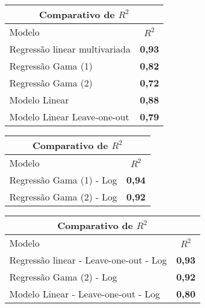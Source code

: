 \documentclass{article}
\begin{document}

\begin{table}[]
	\centering
	\begin{tabular}{lc}
		\hline
		\multicolumn{2}{c}{\textbf{Comparativo de $R^{2}$}} \\ \hline
		Modelo                         & \textbf{$R^{2}$}   \\ \hline
		Regressão linear multivariada                  & \textbf{0,93}      \\
		Regressão Gama (1)         	 & \textbf{0,82}      \\
		Regressão Gama (2)         	 & \textbf{0,72}      \\
		Modelo Linear                  & \textbf{0,88}      \\
		Modelo Linear Leave-one-out    & \textbf{0,79}      \\ \hline 
	\end{tabular}
\end{table}




\begin{table}[]
	\centering
	\begin{tabular}{lc}
		\hline
		\multicolumn{2}{c}{\textbf{Comparativo de $R^{2}$}} \\ \hline
		Modelo                         & \textbf{$R^{2}$}   \\ \hline
		Regressão Gama (1) - Log          & \textbf{0,94}          \\
		Regressão Gama (2) - Log   	   & \textbf{0,92}      \\
\hline
	\end{tabular}
\end{table}



\begin{table}[]
	\centering
	\begin{tabular}{lc}
		\hline
		\multicolumn{2}{c}{\textbf{Comparativo de $R^{2}$}} \\ \hline
		Modelo                         & \textbf{$R^{2}$}   \\ \hline
		Regressão linear - Leave-one-out - Log            & \textbf{0,93}      \\
		Regressão Gama (2) - Log   	   & \textbf{0,92}      \\
		Modelo Linear - Leave-one-out - Log    & \textbf{0,80}      \\ \hline	\end{tabular}
\end{table}
\end{document}

